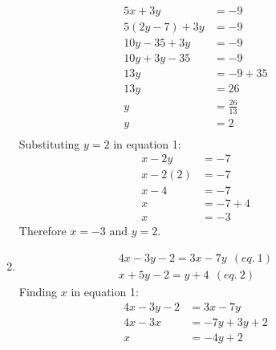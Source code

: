 \documentclass{article}
\begin{document}
\begin{description}
\begin{enumerate}
\begin{equation}
                      \begin{split}
                          5x + 3y      & = -9 \\
                          5(2y-7) + 3y & = -9 \\
                          10y - 35 + 3y & = -9 \\
                          10y + 3y - 35 & = -9 \\
                          13y           & = -9 + 35 \\
                          13y           & = 26 \\
                          y             & = \frac{26}{13} \\
                          y             & = 2 \\
                      \end{split}
                  \end{equation}
                  Substituting $y = 2$ in equation 1:
                  \begin{equation}
                      \begin{split}
                          x - 2y & = -7 \\
                          x - 2(2) & = -7 \\
                          x - 4 & = -7 \\
                          x &= -7 + 4 \\
                          x &= -3
                      \end{split}
                  \end{equation}
                  Therefore $x=-3$ and $y=2$.
            \item
                  \begin{gather*}
                      4x - 3y -2 = 3x - 7y \ \ (eq. \ 1)\\
                      x + 5y - 2 = y + 4 \ \ (eq. \ 2)
                  \end{gather*}
                  Finding $x$ in equation 1:
                  \begin{equation}
                      \begin{split}
                          4x - 3y -2 & = 3x - 7y \\
                          4x - 3x    & = -7y + 3y + 2 \\
                          x    & = -4y + 2 \\
                      \end{split}

\end{equation}
\end{enumerate}
\end{description}
\end{document}
